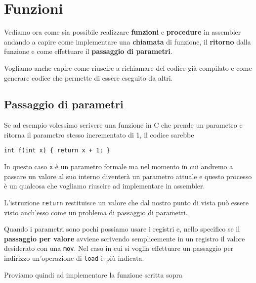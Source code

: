 \section{Funzioni}
Vediamo ora come sia possibile realizzare \textbf{funzioni} e \textbf{procedure} in assembler
andando a capire come implementare una \textbf{chiamata} di funzione, il \textbf{ritorno} dalla
funzione e come effettuare il \textbf{passaggio di parametri}.

Vogliamo anche capire come riuscire a richiamare del codice già compilato e come generare codice
che permette di essere eseguito da altri.

\subsection{Passaggio di parametri}
Se ad esempio volessimo scrivere una funzione in C che prende un parametro e ritorna il parametro
stesso incrementato di 1, il codice sarebbe
\begin{verbatim}
int f(int x) { return x + 1; }
\end{verbatim}
In questo caso \verb|x| è un parametro formale ma nel momento in cui andremo a passare un valore
al suo interno diventerà un parametro attuale e questo processo è un qualcosa che vogliamo riuscire
ad implementare in assembler.

L'istruzione \verb|return| restituisce un valore che dal nostro punto di vista può essere visto
anch'esso come un problema di passaggio di parametri.

Quando i parametri sono pochi possiamo usare i registri e, nello specifico se il
\textbf{passaggio per valore} avviene scrivendo semplicemente in un registro il valore desiderato
con una \verb|mov|. Nel caso in cui si voglia effettuare un passaggio per indirizzo un'operazione
di \verb|load| è più indicata.

Proviamo quindi ad implementare la funzione scritta sopra